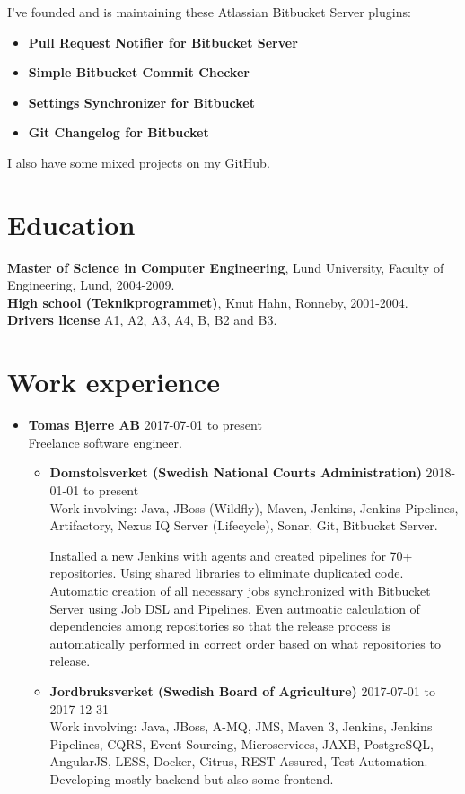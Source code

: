 \documentclass[a4paper]{article}
\begin{document}
I've founded and is maintaining these Atlassian Bitbucket Server plugins:

\begin{itemize}
 \item \textbf{Pull Request Notifier for Bitbucket Server}
 \item \textbf{Simple Bitbucket Commit Checker}
 \item \textbf{Settings Synchronizer for Bitbucket}
 \item \textbf{Git Changelog for Bitbucket}
\end{itemize}

I also have some mixed projects on my GitHub.


\section*{Education}
\textbf{Master of Science in Computer Engineering}, Lund University, Faculty of Engineering, Lund, 2004-2009. \\
\textbf{High school (Teknikprogrammet)}, Knut Hahn, Ronneby, 2001-2004. \\
\textbf{Drivers license} A1, A2, A3, A4, B, B2 and B3. \\
\newpage


\section*{Work experience}
\begin{itemize}
 \item \textbf{Tomas Bjerre AB} 2017-07-01 to present \\
 Freelance software engineer.
 \begin{itemize}
  \item \textbf{Domstolsverket (Swedish National Courts Administration)} 2018-01-01 to present \\
  Work involving: Java, JBoss (Wildfly), Maven, Jenkins, Jenkins Pipelines, Artifactory, Nexus IQ Server (Lifecycle), Sonar, Git, Bitbucket Server.

  Installed a new Jenkins with agents and created pipelines for 70+ repositories. Using shared libraries to eliminate duplicated code. Automatic creation of all necessary jobs synchronized with Bitbucket Server using Job DSL and Pipelines. Even autmoatic calculation of dependencies among repositories so that the release process is automatically performed in correct order based on what repositories to release.
  \item \textbf{Jordbruksverket (Swedish Board of Agriculture)} 2017-07-01 to 2017-12-31 \\
  Work involving: Java, JBoss, A-MQ, JMS, Maven 3, Jenkins, Jenkins Pipelines, CQRS, Event Sourcing, Microservices, JAXB, PostgreSQL, AngularJS, LESS, Docker, Citrus, REST Assured, Test Automation.
  Developing mostly backend but also some frontend.
 \end{itemize}
\end{itemize}
  
\end{document}
